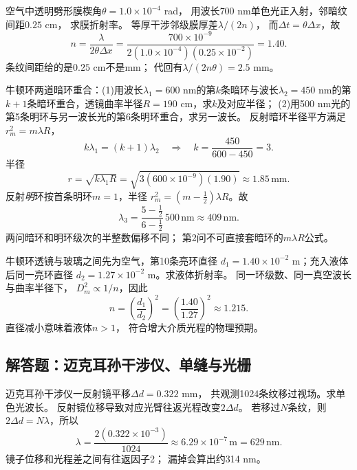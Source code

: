 \problemtext 空气中透明劈形膜楔角$\theta=1.0\times10^{-4}$ rad，
用波长$700$ nm单色光正入射，邻暗纹间距$0.25$ cm，
求膜折射率。
\workings
等厚干涉邻级膜厚差$\lambda/(2n)$，
而$\Delta t=\theta\Delta x$，故
\[
\boxed{n=\frac{\lambda}{2\theta\Delta x}
=\frac{700\times10^{-9}}{2(1.0\times10^{-4})(0.25\times10^{-2})}
=1.40}.
\]
\crosscheck 条纹间距给的是$0.25$ cm不是mm；
代回有$\lambda/(2n\theta)=2.5$ mm。

\problemtext 牛顿环两道暗环重合：(1)用波长$\lambda_1=600$ nm的第$k$条暗环与波长$\lambda_2=450$ nm的第$k+1$条暗环重合，透镜曲率半径$R=190$ cm，求$k$及对应半径；
(2)用500 nm光的第5条明环与另一波长光的第6条明环重合，求另一波长。
\workings
反射暗环半径平方满足$r_m^2=m\lambda R$，
\[
k\lambda_1=(k+1)\lambda_2
\quad\Longrightarrow\quad
\boxed{k=\frac{450}{600-450}=3}.
\]
半径
\[
\boxed{r=\sqrt{k\lambda_1R}
=\sqrt{3(600\times10^{-9})(1.90)}
\approx1.85\,\mathrm{mm}}.
\]
反射\emph{明}环按首条明环$m=1$，半径
$r_m^2=(m-\tfrac12)\lambda R$。故
\[
\boxed{\lambda_3=\frac{5-\tfrac12}{6-\tfrac12}\,500\,\mathrm{nm}
\approx409\,\mathrm{nm}}.
\]
\crosscheck 两问暗环和明环级次的半整数偏移不同；
第2问不可直接套暗环的$m\lambda R$公式。

\problemtext 牛顿环透镜与玻璃之间先为空气，第10条亮环直径
$d_1=1.40\times10^{-2}$ m；充入液体后同一亮环直径
$d_2=1.27\times10^{-2}$ m。求液体折射率。
\workings
同一环级数、同一真空波长与曲率半径下，
$D_m^2\propto1/n$，因此
\[
\boxed{n=\left(\frac{d_1}{d_2}\right)^2
=\left(\frac{1.40}{1.27}\right)^2\approx1.215}.
\]
\crosscheck 直径减小意味着液体$n>1$，
符合增大介质光程的物理预期。

\subsection{解答题：迈克耳孙干涉仪、单缝与光栅}

\problemtext 迈克耳孙干涉仪一反射镜平移$\Delta d=0.322$ mm，
共观测1024条纹移过视场。求单色光波长。
\workings
反射镜位移导致对应光臂往返光程改变$2\Delta d$。
若移过$N$条纹，则$2\Delta d=N\lambda$，所以
\[
\boxed{\lambda=\frac{2(0.322\times10^{-3})}{1024}
\approx6.29\times10^{-7}\,\mathrm m=629\,\mathrm{nm}}.
\]
\crosscheck 镜子位移和光程差之间有往返因子2；
漏掉会算出约314 nm。

